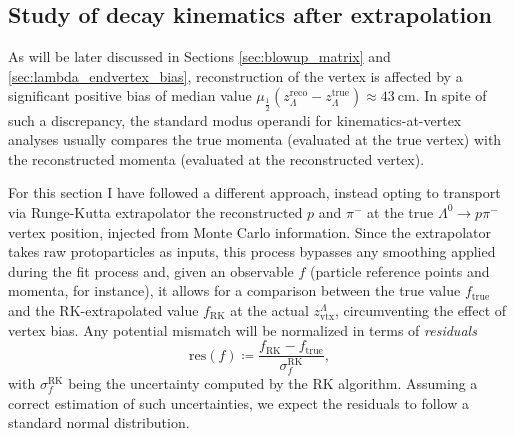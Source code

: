 \subsection{Study of decay kinematics after extrapolation}
\label{sec:3:true_vtx_kinematics}
As will be later discussed in Sections \ref{sec:blowup_matrix} and \ref{sec:lambda_endvertex_bias}, reconstruction of the \lz vertex is affected by a significant positive bias of median value $\mu_\frac{1}{2} \left(z_\Lambda^\text{reco} - z_\Lambda^\text{true}\right) \approx \SI{43}{\centi\meter}$.
In spite of such a discrepancy, the standard modus operandi for kinematics-at-vertex analyses usually compares the true momenta (evaluated at the true vertex) with the reconstructed momenta (evaluated at the reconstructed vertex).

For this section I have followed a different approach, instead opting to transport via Runge-Kutta extrapolator the reconstructed $p$ and $\pi^-$ at the true  $\Lambda^0 \rightarrow p\pi^-$ vertex position, injected from Monte Carlo information.
Since the extrapolator takes raw protoparticles as inputs, this process bypasses any smoothing applied during the fit process and, given an observable $f$ (particle reference points and momenta, for instance), it allows for a comparison between the true value $f_\text{true}$ and the RK-extrapolated value $f_\text{RK}$ at the actual $z_\text{vtx}^\Lambda$, circumventing the effect of vertex bias.
Any potential mismatch will be normalized in terms of \textit{residuals}
\begin{equation}
	\text{res}(f) \coloneqq \frac{f_\text{RK} - f_\text{true}}{\sigma_f^\text{RK}},
\end{equation}
with $\sigma_f^\text{RK}$ being the uncertainty computed by the RK algorithm.
Assuming a correct estimation of such uncertainties, we expect the residuals to follow a standard normal distribution.


